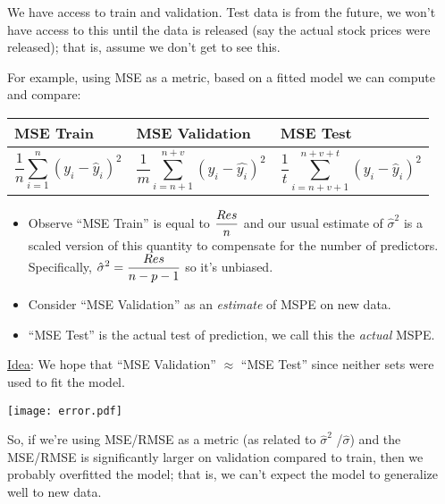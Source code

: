 We have access to train and validation. Test data is from the future,
we won't have access to this until the data is released (say
the actual stock prices were released); that is, assume we don't get
to see this.

For example, using MSE as a metric, based on a fitted model we can
compute and compare:
\begin{table}[ht]
      \centering
      \begin{tabularx}{\linewidth}{@{}YYY@{}}
            \toprule
            MSE Train & MSE Validation & MSE Test \\
            \midrule
            \[ \frac{1}{n} \sum_{i=1}^{n} (y_i-\hat{y}_i)^2 \]
                      &
            \[ \frac{1}{m} \sum_{i=n+1}^{n+v} (y_i-\hat{y_i})^2 \]
                      &
            \[ \frac{1}{t} \sum_{i=n+v+1}^{n+v+t}(y_i-\hat{y}_i)^2  \]
            \\
            \bottomrule
      \end{tabularx}
\end{table}

\begin{itemize}
      \item Observe ``MSE Train'' is equal to $ \displaystyle \frac{\relax{Res}}{n} $
            and our usual estimate of $ \hat{\sigma}^2 $
            is a scaled version of this quantity
            to compensate for the number of predictors. Specifically,
            $ \displaystyle  \hat{\sigma}^2=\frac{\relax{Res}}{n-p-1} $
            so it's unbiased.
      \item Consider ``MSE Validation'' as an \emph{estimate} of MSPE
            on new data.
      \item ``MSE Test'' is the actual test of prediction,
            we call this the \emph{actual} MSPE.\
\end{itemize}
\underline{Idea}: We hope that ``MSE Validation'' $ \approx $
``MSE Test'' since neither sets were used to fit the model.

\begin{minipage}{0.7\textwidth}
      \texttt{[image: error.pdf]}
\end{minipage}
\begin{minipage}{0.23\textwidth}
      \raggedright{}
      So, if we're using MSE/RMSE
      as a metric (as related to $ \hat{\sigma}^2 $ /$ \hat{\sigma} $)
      and the MSE/RMSE is significantly larger
      on validation compared to train,
      then we probably overfitted the model;
      that is, we can't expect the model
      to generalize well to new data.
\end{minipage}
